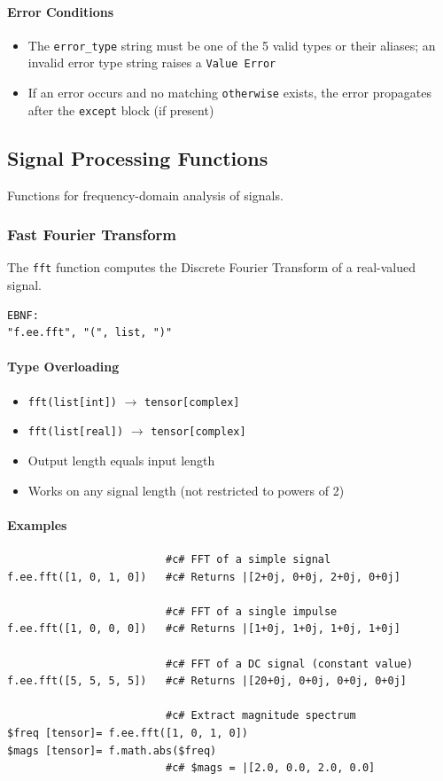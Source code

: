 \paragraph{Error Conditions}
\begin{itemize}
\item The \texttt{error\_type} string must be one of the 5 valid types or their aliases; an invalid error type string raises a \texttt{Value Error}
\item If an error occurs and no matching \texttt{otherwise} exists, the error propagates after the \texttt{except} block (if present)
\end{itemize}

\subsection{Signal Processing Functions}
Functions for frequency-domain analysis of signals.

\subsubsection{Fast Fourier Transform}
The \texttt{fft} function computes the Discrete Fourier Transform of a real-valued signal.
\begin{verbatim}
EBNF:
"f.ee.fft", "(", list, ")"
\end{verbatim}

\paragraph{Type Overloading}
\begin{itemize}
\item \texttt{fft(list[int])} $\rightarrow$ \texttt{tensor[complex]}
\item \texttt{fft(list[real])} $\rightarrow$ \texttt{tensor[complex]}
\item Output length equals input length
\item Works on any signal length (not restricted to powers of 2)
\end{itemize}

\paragraph{Examples}
\begin{verbatim}
                         #c# FFT of a simple signal
f.ee.fft([1, 0, 1, 0])   #c# Returns |[2+0j, 0+0j, 2+0j, 0+0j]

                         #c# FFT of a single impulse
f.ee.fft([1, 0, 0, 0])   #c# Returns |[1+0j, 1+0j, 1+0j, 1+0j]

                         #c# FFT of a DC signal (constant value)
f.ee.fft([5, 5, 5, 5])   #c# Returns |[20+0j, 0+0j, 0+0j, 0+0j]

                         #c# Extract magnitude spectrum
$freq [tensor]= f.ee.fft([1, 0, 1, 0])
$mags [tensor]= f.math.abs($freq)
                         #c# $mags = |[2.0, 0.0, 2.0, 0.0]
\end{verbatim}

